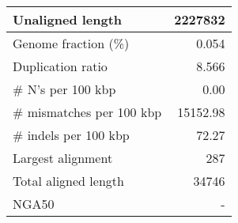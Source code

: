 \documentclass[12pt,a4paper]{article}
\begin{document}
\begin{table}[ht]
\begin{center}
\begin{tabular}{|l*{1}{|r}|}
Unaligned length & 2227832 \\ \hline
Genome fraction (\%) & 0.054 \\ \hline
Duplication ratio & 8.566 \\ \hline
\# N's per 100 kbp & 0.00 \\ \hline
\# mismatches per 100 kbp & 15152.98 \\ \hline
\# indels per 100 kbp & 72.27 \\ \hline
Largest alignment & 287 \\ \hline
Total aligned length & 34746 \\ \hline
NGA50 & - \\ \hline
\end{tabular}
\end{center}
\end{table}
\end{document}
